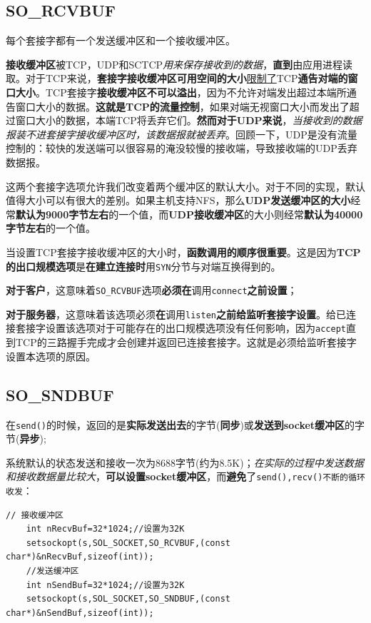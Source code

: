 \documentclass[UTF8,a4paper,12pt]{ctexbook}
\begin{document}
		\subsection{SO\_RCVBUF}
			每个套接字都有一个发送缓冲区和一个接收缓冲区。
			
			\textbf{接收缓冲区}被TCP，UDP和SCTCP\textit{用来保存接收到的数据}，\textbf{直到}由应用进程读取。对于TCP来说，\textbf{套接字接收缓冲区可用空间的大小}\underline{限制了}TCP\textbf{通告对端的窗口大小}。TCP套接字\textbf{接收缓冲区不可以溢出}，因为不允许对端发出超过本端所通告窗口大小的数据。\textbf{这就是TCP的流量控制}，如果对端无视窗口大小而发出了超过窗口大小的数据，本端TCP将丢弃它们。\textbf{然而对于UDP来说}，\textit{当接收到的数据报装不进套接字接收缓冲区时，该数据报就被丢弃}。回顾一下，UDP是没有流量控制的：较快的发送端可以很容易的淹没较慢的接收端，导致接收端的UDP丢弃数据报。
			
			这两个套接字选项允许我们改变着两个缓冲区的默认大小。对于不同的实现，默认值得大小可以有很大的差别。如果主机支持NFS，那么\textbf{UDP发送缓冲区的大小}经常\textbf{默认为9000字节左右}的一个值，而\textbf{UDP接收缓冲区}的大小则经常\textbf{默认为40000字节左右}的一个值。
			
			当设置TCP套接字接收缓冲区的大小时，\textbf{函数调用的顺序很重要}。这是因为\textbf{TCP的出口规模选项}是\textbf{在建立连接时}用\verb|SYN|分节与对端互换得到的。
			
			\textbf{对于客户}，这意味着\verb|SO_RCVBUF|选项\textbf{必须在}调用\verb|connect|\textbf{之前设置}；
			
			\textbf{对于服务器}，这意味着该选项必须\textbf{在}调用\verb|listen|\textbf{之前给监听套接字设置}。给已连接套接字设置该选项对于可能存在的出口规模选项没有任何影响，因为\verb|accept|直到TCP的三路握手完成才会创建并返回已连接套接字。这就是必须给监听套接字设置本选项的原因。
			
		\subsection{SO\_SNDBUF}
			在\verb|send()|的时候，返回的是\textbf{实际发送出去}的字节(\textbf{同步})或\textbf{发送到socket缓冲区}的字节(\textbf{异步});
			
			系统默认的状态发送和接收一次为8688字节(约为8.5K)；\textit{在实际的过程中发送数据和接收数据量比较大}，\textbf{可以设置socket缓冲区}，而\textbf{避免}了\verb|send(),recv()不断的循环收发|：
			
			\begin{lstlisting}[frame=L]
	// 接收缓冲区
	int nRecvBuf=32*1024;//设置为32K
	setsockopt(s,SOL_SOCKET,SO_RCVBUF,(const char*)&nRecvBuf,sizeof(int));
	//发送缓冲区
	int nSendBuf=32*1024;//设置为32K
	setsockopt(s,SOL_SOCKET,SO_SNDBUF,(const char*)&nSendBuf,sizeof(int));
		\end{lstlisting}
		
\end{document}
